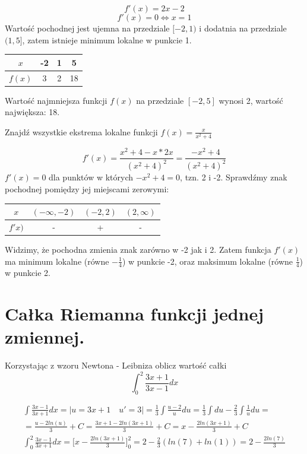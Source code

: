\documentclass[12pt]{article}
\begin{document}
    \[f'(x) = 2x - 2\]
    \[f'(x) = 0 \Leftrightarrow x = 1\]
    Wartość pochodnej jest ujemna na przedziale $[-2, 1)$ i dodatnia na przedziale $(1, 5]$, zatem istnieje minimum lokalne w punkcie 1.

    \begin{center}
        \begin{tabular}{c||c|c|c}
            $x$ & -2 & 1 & 5 \\
            \hline
            $f(x)$ & 3 & 2 & 18 \\
        \end{tabular}
    \end{center}

    Wartość najmniejsza funkcji $f(x)$ na przedziale $[-2, 5]$ wynosi 2, wartość największa: 18.


    \begin{exercise}
        Znajdź wszystkie ekstrema lokalne funkcji $f(x) = \frac{x}{x^2 + 4}$
    \end{exercise}

    \[f'(x) = \frac{x^2 + 4 - x * 2x}{(x^2 + 4)^2} = \frac{-x^2 + 4}{(x^2 + 4)^2}\]
    $f'(x) = 0$ dla punktów w których $-x^2 + 4 = 0$, tzn. 2 i -2. Sprawdźmy znak pochodnej pomiędzy jej miejscami zerowymi:

    \begin{center}
        \begin{tabular}{c||c|c|c}
            $x$ &$(-\infty, -2)$ & $(-2, 2)$ & $(2, \infty)$ \\
            \hline
            $f'x)$ & - & + & -
        \end{tabular}
    \end{center}

    Widzimy, że pochodna zmienia znak zarówno w -2 jak i 2. Zatem funkcja $f'(x)$ ma minimum lokalne
    (równe $-\frac{1}{4}$) w punkcie -2, oraz maksimum lokalne (równe $\frac{1}{4}$) w punkcie 2.

    \newpage

    \section{Całka Riemanna funkcji jednej zmiennej.}

    \begin{exercise}
        Korzystając z wzoru Newtona - Leibniza oblicz wartość całki \[\int_0^2 \frac{3x + 1}{3x - 1}dx\]
    \end{exercise}

    \begin{gather*}
        \int\frac{3x - 1}{3x + 1} dx = \big| u = 3x + 1 \quad u' = 3\big| = \frac{1}{3}\int \frac{u - 2}{u}du
        = \frac{1}{3} \int du - \frac{2}{3}\int\frac{1}{u}du =\\
        = \frac{u - 2ln(u)}{3} + C = \frac{3x + 1 - 2ln(3x + 1)}{3} + C = x - \frac{2ln(3x + 1)}{3} + C\\
        \int_0^2\frac{3x - 1}{3x + 1} dx = \big[ x - \frac{2ln(3x + 1)}{3} \big]^2_0 = 2 - \frac{2}{3}(ln(7) + ln(1)) = 2 - \frac{2ln(7)}{3}\\
    \end{gather*}
\end{document}
